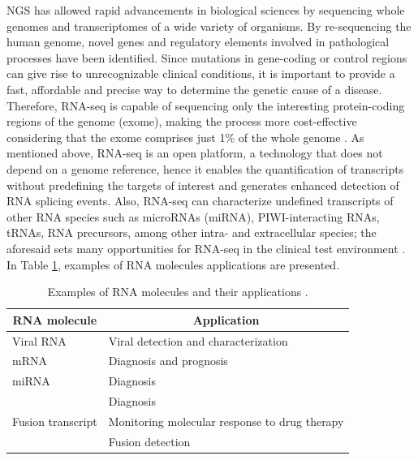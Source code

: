NGS has allowed rapid advancements in biological sciences by sequencing whole genomes and transcriptomes of a wide variety of organisms. By re-sequencing the human genome, novel genes and regulatory elements involved in pathological processes have been identified. Since mutations in gene-coding or control regions can give rise to unrecognizable clinical conditions, it is important to provide a fast, affordable and precise way to determine the genetic cause of a disease. Therefore, RNA-seq is capable of sequencing only the interesting protein-coding regions of the genome (exome), making the process more cost-effective considering that the exome comprises just 1\% of the whole genome \cite{Grada}. As mentioned above, RNA-seq is an open platform, a technology that does not depend on a genome reference, hence it enables the quantification of transcripts without predefining the targets of interest and generates enhanced detection of RNA splicing events. Also, RNA-seq can characterize undefined transcripts of other RNA species such as microRNAs (miRNA), PIWI-interacting RNAs, tRNAs, RNA precursors, among other intra- and extracellular species; the aforesaid sets many opportunities for RNA-seq in the clinical test environment \cite{Byron}. In Table \ref{table:RNA-mol}, examples of RNA molecules applications are presented.

\begin{table}[ht]
\centering
\caption{Examples of RNA molecules and their applications \cite{Byron}.}
\label{table:RNA-mol}
\begin{tabular}{ll}
\hline
\multicolumn{1}{c}{\textbf{RNA molecule}} & \multicolumn{1}{c}{\textbf{Application}}      \\ \hline
Viral RNA                                 & Viral detection and characterization          \\
mRNA                                      & Diagnosis and prognosis                       \\
miRNA                                     & Diagnosis                                     \\
\multirow{3}{*}{Fusion transcript}        & Diagnosis                                     \\
                                          & Monitoring molecular response to drug therapy \\
                                          & Fusion detection                              \\ \hline
\end{tabular}
\end{table}

